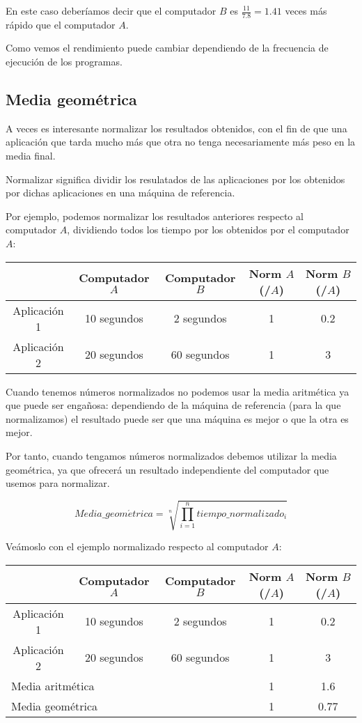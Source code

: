 \documentclass[12pt,onecolumn]{memoir}
\begin{document}
En este caso deberíamos decir que el computador $B$ es
$\frac{11}{7.8}=1.41$ veces más rápido que el computador $A$.

Como vemos el rendimiento puede cambiar dependiendo de la frecuencia
de ejecución de los programas.

\subsection{Media geométrica}
\label{sec:media_geometrica}

A veces es interesante normalizar los resultados obtenidos, con el fin
de que una aplicación que tarda mucho más que otra no tenga
necesariamente más peso en la media final.

Normalizar significa dividir los resulatados de las aplicaciones por
los obtenidos por dichas aplicaciones en una máquina de referencia.

Por ejemplo, podemos normalizar los resultados anteriores respecto al
computador $A$, dividiendo todos los tiempo por los obtenidos por el
computador $A$:

\begin{center}
\begin{tabular}{ccccc}
\hline
  & Computador $A$ & Computador $B$ & Norm $A$(/$A$) & Norm $B$(/$A$) \\ 
\hline
Aplicación 1 & 10 segundos & 2 segundos & 1 & 0.2 \\  
Aplicación 2 & 20 segundos & 60 segundos & 1 & 3 \\
\hline
\end{tabular}
\end{center}

Cuando tenemos números normalizados no podemos usar la media
aritmética ya que puede ser engañosa: dependiendo de la máquina de
referencia (para la que normalizamos) el resultado puede ser que una
máquina es mejor o que la otra es mejor.

Por tanto, cuando tengamos números normalizados debemos utilizar la
media geométrica, ya que ofrecerá un resultado independiente del
computador que usemos para normalizar.

\[ Media\_geom\acute{e}trica = \sqrt[n]{\prod_{i=1}^{n} tiempo\_normalizado_i} \]

Veámoslo con el ejemplo normalizado respecto al computador $A$:

\begin{center}
\begin{tabular}{ccccc}
\hline
  & Computador $A$ & Computador $B$ & Norm $A$(/$A$) & Norm $B$(/$A$) \\ 
\hline
Aplicación 1 & 10 segundos & 2 segundos & 1 & 0.2 \\  
Aplicación 2 & 20 segundos & 60 segundos & 1 & 3 \\
\hline
\multicolumn{2}{l}{Media aritmética} &  & 1 & 1.6 \\
\hline
\multicolumn{2}{l}{Media geométrica} &  & 1 & 0.77 \\
\hline
\end{tabular}
\end{center}
\end{document}
